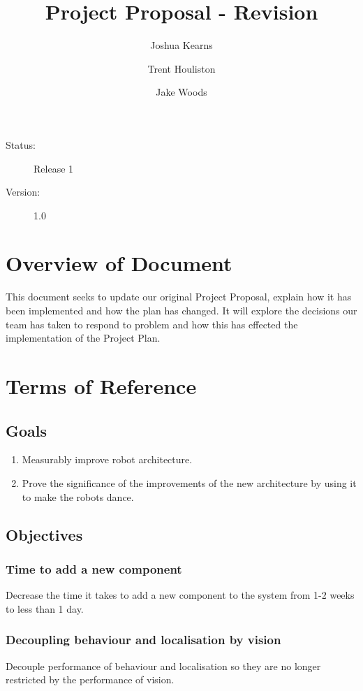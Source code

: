 \documentclass[english,12pt]{scrartcl}
\title{Project Proposal - Revision}
\author{Joshua Kearns \and Trent Houliston \and Jake Woods}
\begin{document}
	\maketitle
	\vfill
	{\large
		\begin{description}
			\item [Status:] Release 1
			\item [Version:] 1.0
		\end{description}}

	\clearpage
	\tableofcontents
	\clearpage

	\section{Overview of Document}
	This document seeks to update our original Project Proposal, explain how it has been implemented and how the plan has changed. It will explore the decisions our team has taken to respond to problem and how this has effected the implementation of the Project Plan.

	\section{Terms of Reference}
		\subsection {Goals}
			\begin{enumerate}
				\item Measurably improve robot architecture.
				\item Prove the significance of the improvements of the new architecture by using it to make the robots dance.
			\end{enumerate}
		\subsection {Objectives}
			\subsubsection{Time to add a new component}
				Decrease the time it takes to add a new component to the system from 1-2 weeks to less than 1 day.
			\subsubsection{Decoupling behaviour and localisation by vision}
				Decouple performance of behaviour and localisation so they are no longer restricted by the performance of vision.
\end{document}
